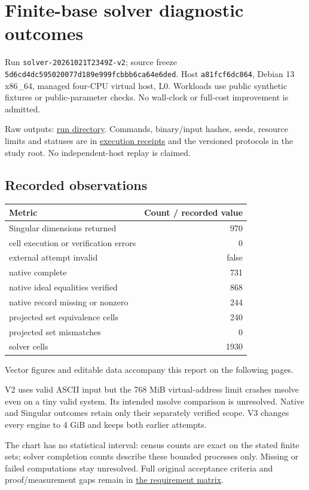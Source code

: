 \documentclass[
  10pt,
  letterpaper,
  landscape]{article}
\author{}
\date{}
\begin{document}
\section{Finite-base solver diagnostic
outcomes}\label{finite-base-solver-diagnostic-outcomes}

Run \texttt{solver-20261021T2349Z-v2}; source freeze
\texttt{5d6cd4dc595020077d189e999fcbbb6ca64e6ded}. Host
\texttt{a81fcf6dc864}, Debian 13 x86\_64, managed four-CPU virtual host,
L0. Workloads use public synthetic fixtures or public-parameter checks.
No wall-clock or full-cost improvement is admitted.

Raw outputs:
\href{../../../execution-v1/runs/solver-20261021T2349Z-v2/}{run
directory}. Commands, binary/input hashes, seeds, resource limits and
statuses are in \href{../../../execution-v1/}{execution receipts} and
the versioned protocols in the study root. No independent-host replay is
claimed.

\subsection{Recorded observations}\label{recorded-observations}

\begin{longtable}[]{@{}lr@{}}
\toprule\noalign{}
Metric & Count / recorded value \\
\midrule\noalign{}
\endhead
\bottomrule\noalign{}
\endlastfoot
Singular dimensions returned & 970 \\
cell execution or verification errors & 0 \\
external attempt invalid & false \\
native complete & 731 \\
native ideal equalities verified & 868 \\
native record missing or nonzero & 244 \\
projected set equivalence cells & 240 \\
projected set mismatches & 0 \\
solver cells & 1930 \\
\end{longtable}

Vector figures and editable data accompany this report on the following pages.

V2 uses valid ASCII input but the 768 MiB virtual-address limit crashes
msolve even on a tiny valid system. Its intended msolve comparison is
unresolved. Native and Singular outcomes retain only their separately
verified scope. V3 changes every engine to 4 GiB and keeps both earlier
attempts.

The chart has no statistical interval: census counts are exact on the
stated finite sets; solver completion counts describe these bounded
processes only. Missing or failed computations stay unresolved. Full
original acceptance criteria and proof/measurement gaps remain in
\href{../../../EXPERIMENTS.md}{the requirement matrix}.
\end{document}
